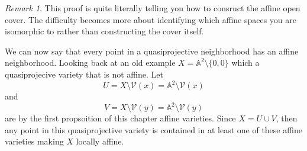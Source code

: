 \documentclass[40pt]{article}
\newcommand{\A}{\mathbb{A}}
\newcommand{\V}{\mathcal{V}}
\theoremstyle{remark}
\newtheorem{remark}[theorem]{Remark}
\begin{document}
			\begin{remark}
				This proof is quite literally telling you how to consruct the affine open cover. The difficulty becomes more about identifying which affine spaces you are isomorphic to rather than constructing the cover itself.
			\end{remark}
			We can now say that every point in a quasiprojective neighborhood has an affine neighborhood. Looking back at an old example $X = \A^2 \setminus \{0,0\}$ which a quasiprojecive variety that is not affine. Let 
			\[
			U = X \setminus \V(x) = \A^2 \setminus \V(x)
			\]
			and
			\[
			V = X \setminus \V(y) = \A^2 \setminus \V(y)
			\]
			are by the first propsoition of this chapter affine varieties. Since $X = U \cup V$, then any point in this quasiprojective variety is contained in at least one of these affine varieties making $X$ locally affine. 
			
\end{document}
